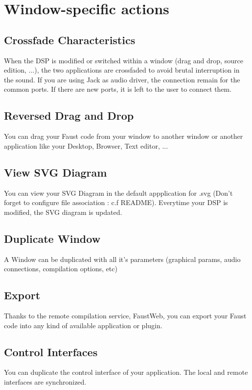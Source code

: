 \documentclass[a4paper]{article}
\begin{document}
\section{Window-specific actions}

\subsection{Crossfade Characteristics}

When the DSP is modified or switched within a window (drag and drop, source edition, ...), the two applications are crossfaded to avoid brutal interruption in the sound. If you are using Jack as audio driver, the connection remain for the common ports. If there are new ports, it is left to the user to connect them. 

\subsection{Reversed Drag and Drop}
You can drag your Faust code from your window to another window or another application like your Desktop, Browser, Text editor, ...

\subsection{View SVG Diagram}
You can view your SVG Diagram in the default appplication for .svg (Don't forget to configure file association : c.f README). Everytime your DSP is modified, the SVG diagram is updated.

\subsection{Duplicate Window}
A Window can be duplicated with all it's parameters (graphical params, audio connections, compilation options, etc)

\subsection{Export}
Thanks to the remote compilation service, FaustWeb, you can export your Faust code into any kind of available application or plugin. 

\subsection{Control Interfaces}
You can duplicate the control interface of your application. The local and remote interfaces are synchronized.
\end{document}
